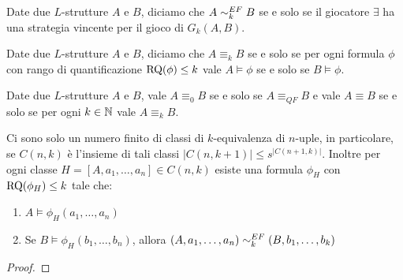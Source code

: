 \begin{definizione}
 Date due $L$-strutture $A$ e $B$, diciamo che $A \sim^{EF}_k B$ se e solo se
 il giocatore $\exists$ ha una strategia vincente per il gioco di \EF{} $G_k(A,B)$.
\end{definizione}

\begin{definizione}
 Date due $L$-strutture $A$ e $B$, diciamo che $A \equiv_k B$ se e solo se
 per ogni formula $\phi$ con rango di quantificazione $\operatorname{RQ}(\phi) \leq k$ vale
 $A \models \phi$ se e solo se $B \models \phi$.
\end{definizione}

\begin{osservazione}
 Date due $L$-strutture $A$ e $B$, vale $A \equiv_0 B$ se e solo se
 $A \equiv_{QF} B$ e vale $A \equiv B$ se e solo se per ogni $k \in \mathbb{N}$ vale
 $A \equiv_k B$.
\end{osservazione}

\begin{lemma}
\label{lemma:finite-formulas}
 Ci sono solo un numero finito di classi di $k$-equivalenza di $n$-uple,
 in particolare, se $C(n,k)$
 è l'insieme di tali classi $|C(n,k+1)| \leq s^{|C(n+1,k)|}$. Inoltre per ogni
 classe $H=[A,a_1,\ldots,a_n] \in C(n,k)$ esiste una formula $\phi_H$
 con $\operatorname{RQ}(\phi_H) \leq k$ tale che:
 \begin{enumerate}
  \item $A \models \phi_H(a_1, \ldots, a_n)$
  \item Se $B \models \phi_H(b_1,\ldots,b_n)$, allora $(A,a_1,\ldots, a_n) \sim^{EF}_k (B,b_1,\ldots,b_k)$
 \end{enumerate}
\end{lemma}
\begin{proof}
\end{proof}



